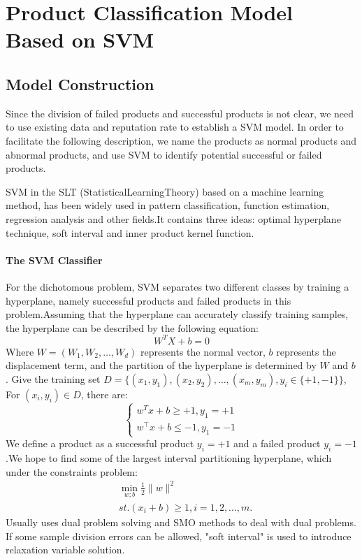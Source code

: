 \documentclass[../mcmpaper]{subfiles}
\begin{document}
    \section{Product Classification Model Based on SVM}
    \subsection{Model Construction}
    Since the division of failed products and successful products is not clear, we need to use existing data and reputation rate to establish a SVM model. In order to facilitate the following description, we name the products as normal products and abnormal products, and use SVM to identify potential successful or failed products.
    \par
    SVM\cite{6} in the SLT (StatisticalLearningTheory) based on a machine learning method, has been widely used in pattern classification, function estimation, regression analysis and other fields.It contains three ideas: optimal hyperplane technique, soft interval and inner product kernel function.
    \paragraph{The SVM Classifier}
    For the dichotomous problem, SVM separates two different classes by training a hyperplane, namely successful products and failed products in this problem.Assuming that the hyperplane can accurately classify training samples, the hyperplane can be described by the following equation:
    \begin{equation}
    W^TX+b=0
    \end{equation}
    Where $W=(W_1, W_2,\dots,W_d)$ represents the normal vector, $b$ represents the displacement term, and the partition of the hyperplane is determined by $W$ and $b$. Give the training set $D=\{(x_1, y_1),(x_2, y_2),\dots,(x_m, y_m),y_i\in \{+1, -1\}\}$, For $(x_i,y_i)\in D$, there are:
    \begin{equation}
    \left\{\begin{array}{l}
    w^{T} x+b \geq+1, y_{1}=+1 \\
    w^{\top} x+b \leq-1, y_{1}=-1
    \end{array}\right.
    \end{equation}
    We define a product as a successful product $y_i=+1$ and a failed product $y_i=-1$.We hope to find some of the largest interval partitioning hyperplane, which under the constraints problem:
    \begin{equation}
    \begin{aligned}
    &\min _{w ; b} \frac{1}{2}\|w\|^{2} \\
    &st.\left(x_{i}+b\right) \geq 1, i=1,2, \ldots, m .
    \end{aligned}
    \end{equation}
    Usually uses dual problem solving and SMO methods to deal with dual problems. If some sample division errors can be allowed, "soft interval" is used to introduce relaxation variable solution.
\end{document}
